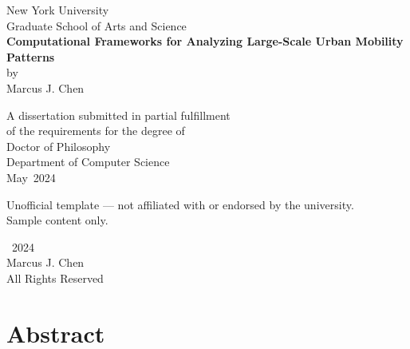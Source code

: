 \documentclass[12pt,letterpaper,twoside]{report}
\newcommand{\doctitle}{Computational Frameworks for Analyzing Large-Scale Urban Mobility Patterns}
\newcommand{\docauthor}{Marcus J. Chen}
\newcommand{\docdept}{Department of Computer Science}
\newcommand{\docschool}{Graduate School of Arts and Science}
\newcommand{\docuni}{New York University}
\newcommand{\docdegree}{Doctor of Philosophy}
\newcommand{\docmonth}{May}
\newcommand{\docyear}{2024}
\begin{document}

\begin{titlepage}
\thispagestyle{empty}
\begin{center}

\vspace*{1.5in}

{\Large\color{nyugray}\docuni}\\[6pt]
{\large\color{nyugray}\docschool}\\[60pt]

{\Huge\bfseries\color{nyuviolet}\doctitle}\\[40pt]

{\large\color{nyugray}by}\\[16pt]

{\LARGE\color{nyugray}\docauthor}\\[80pt]

\begin{minipage}{0.7\textwidth}
\centering
\singlespacing
{\normalsize\color{nyugray}
A dissertation submitted in partial fulfillment\\
of the requirements for the degree of\\
\docdegree\\[10pt]
\docdept\\[24pt]
\docmonth\ \docyear}
\end{minipage}

\vfill

{\footnotesize\color{nyugray!60!white}
Unofficial template --- not affiliated with or endorsed by the university.\\
Sample content only.}

\end{center}
\end{titlepage}

\clearpage
{}
\setcounter{page}{2}

\thispagestyle{plain}
\begin{center}
\vspace*{0.4\textheight}

\textcopyright\ \docyear\\[10pt]
\docauthor\\[10pt]
All Rights Reserved

\vfill
\end{center}

\chapter*{Abstract}
\thispagestyle{plain}
\end{document}
